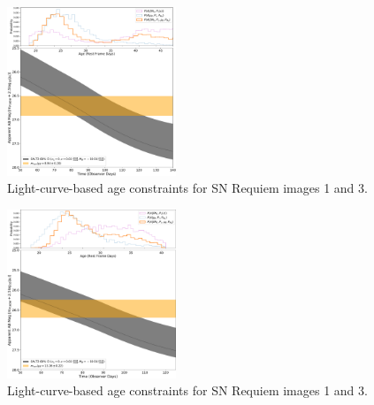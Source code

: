 \documentclass[12pt,dvipsnames]{article}
\def\SNABC{SN Requiem\xspace}
\begin{document}
\begin{figure}
    \centering
    \includegraphics[width=0.45\textwidth]{Images/lightcurve_image1.pdf}
    \caption{Light-curve-based age constraints for \SNABC images 1 and 3.}
    \label{fig:lightcurve1}
\end{figure}
\begin{figure}
    \centering
    \includegraphics[width=0.45\textwidth]{Images/lightcurve_image3.pdf}
    \caption{Light-curve-based age constraints for \SNABC images 1 and 3.}
    \label{fig:lightcurve3}
\end{figure}
\end{document}

